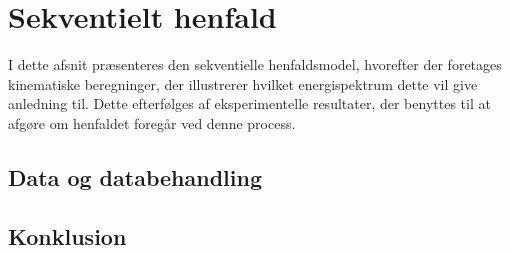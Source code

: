 \chapter{Sekventielt henfald}
\label{cha:sekventielt-henfald}
I dette afsnit præsenteres den sekventielle henfaldsmodel, hvorefter der foretages kinematiske
beregninger, der illustrerer hvilket energispektrum dette vil give anledning til. Dette efterfølges
af eksperimentelle resultater, der benyttes til at afgøre om henfaldet foregår ved denne process.  





\section{Data og databehandling}
\label{sec:sek-data}





\section{Konklusion}
\label{sec:sekv-konklusion}


